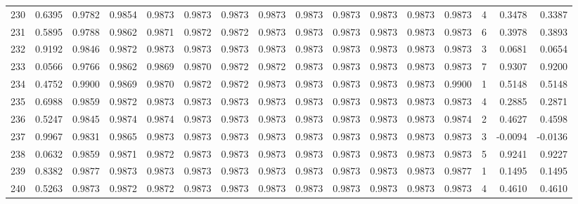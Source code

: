 \begin{tabular}{lrrrrrrrrrrrrrrr}
230 &      0.6395 &  0.9782 &  0.9854 &  0.9873 &  0.9873 &  0.9873 &  0.9873 &  0.9873 &  0.9873 &  0.9873 &   0.9873 &     0.9873 &      4 &                    0.3478 &                     0.3387 \\
231 &      0.5895 &  0.9788 &  0.9862 &  0.9871 &  0.9872 &  0.9872 &  0.9873 &  0.9873 &  0.9873 &  0.9873 &   0.9873 &     0.9873 &      6 &                    0.3978 &                     0.3893 \\
232 &      0.9192 &  0.9846 &  0.9872 &  0.9873 &  0.9873 &  0.9873 &  0.9873 &  0.9873 &  0.9873 &  0.9873 &   0.9873 &     0.9873 &      3 &                    0.0681 &                     0.0654 \\
233 &      0.0566 &  0.9766 &  0.9862 &  0.9869 &  0.9870 &  0.9872 &  0.9872 &  0.9873 &  0.9873 &  0.9873 &   0.9873 &     0.9873 &      7 &                    0.9307 &                     0.9200 \\
234 &      0.4752 &  0.9900 &  0.9869 &  0.9870 &  0.9872 &  0.9872 &  0.9873 &  0.9873 &  0.9873 &  0.9873 &   0.9873 &     0.9900 &      1 &                    0.5148 &                     0.5148 \\
235 &      0.6988 &  0.9859 &  0.9872 &  0.9873 &  0.9873 &  0.9873 &  0.9873 &  0.9873 &  0.9873 &  0.9873 &   0.9873 &     0.9873 &      4 &                    0.2885 &                     0.2871 \\
236 &      0.5247 &  0.9845 &  0.9874 &  0.9874 &  0.9873 &  0.9873 &  0.9873 &  0.9873 &  0.9873 &  0.9873 &   0.9873 &     0.9874 &      2 &                    0.4627 &                     0.4598 \\
237 &      0.9967 &  0.9831 &  0.9865 &  0.9873 &  0.9873 &  0.9873 &  0.9873 &  0.9873 &  0.9873 &  0.9873 &   0.9873 &     0.9873 &      3 &                   -0.0094 &                    -0.0136 \\
238 &      0.0632 &  0.9859 &  0.9871 &  0.9872 &  0.9873 &  0.9873 &  0.9873 &  0.9873 &  0.9873 &  0.9873 &   0.9873 &     0.9873 &      5 &                    0.9241 &                     0.9227 \\
239 &      0.8382 &  0.9877 &  0.9873 &  0.9873 &  0.9873 &  0.9873 &  0.9873 &  0.9873 &  0.9873 &  0.9873 &   0.9873 &     0.9877 &      1 &                    0.1495 &                     0.1495 \\
240 &      0.5263 &  0.9873 &  0.9872 &  0.9872 &  0.9873 &  0.9873 &  0.9873 &  0.9873 &  0.9873 &  0.9873 &   0.9873 &     0.9873 &      4 &                    0.4610 &                     0.4610 \\

\end{tabular}
